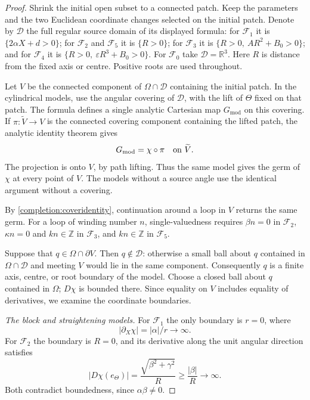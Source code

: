 \documentclass[11pt,a4paper]{article}
\numberwithin{equation}{section}
\theoremstyle{plain}
\theoremstyle{definition}
\theoremstyle{remark}
\begin{document}
\begin{proof}
Shrink the initial open subset to a connected patch. Keep the
parameters and the two Euclidean coordinate changes selected
on the initial patch. Denote by $\mathcal D$ the full regular source
domain of its displayed formula: for $\mathcal F_1$ it is
$\{2\alpha X+d>0\}$; for $\mathcal F_2$ and $\mathcal F_5$ it is
$\{R>0\}$; for $\mathcal F_3$ it is
$\{R>0,\ AR^2+B_0>0\}$; and for $\mathcal F_4$ it is
$\{R>0,\ \varepsilon R^3+B_0>0\}$. For $\mathcal F_0$ take
$\mathcal D=\mathbb R^3$. Here $R$ is distance from the fixed axis or
centre. Positive roots are used throughout.

Let $V$ be the connected component of $\Omega\cap\mathcal D$ containing
the initial patch. In the cylindrical models, use the angular covering
of $\mathcal D$, with the lift of $\Theta$ fixed on that patch. The
formula defines a single analytic Cartesian map $G_{\mathrm{mod}}$ on this covering.
If $\pi:\widetilde V\to V$ is the connected covering component containing
the lifted patch, the analytic identity theorem gives
\begin{equation}\label{completion:coveridentity}
                 G_{\mathrm{mod}}=\chi\circ\pi\quad\hbox{on }\widetilde V.
\end{equation}
The projection is onto $V$, by path lifting. Thus the same model gives
the germ of $\chi$ at every point of $V$. The models without a source
angle use the identical argument without a covering.

By \eqref{completion:coveridentity}, continuation around a loop in $V$
returns the same germ. For a loop of winding number
$n$, single-valuedness requires $\beta n=0$ in $\mathcal F_2$,
$\kappa n=0$ and $kn\in\mathbb Z$ in $\mathcal F_3$, and
$kn\in\mathbb Z$ in $\mathcal F_5$.

Suppose that $q\in\Omega\cap\partial V$. Then
$q\notin\mathcal D$: otherwise a small ball about $q$ contained in
$\Omega\cap\mathcal D$ and meeting $V$ would lie in the same component.
Consequently $q$ is a finite axis, centre, or root boundary of the
model. Choose a closed ball about $q$ contained in $\Omega$; $D\chi$ is
bounded there. Since equality on $V$ includes equality of derivatives,
we examine the coordinate boundaries.

\emph{The block and straightening models.}
For $\mathcal F_1$ the only boundary is $r=0$, where
\[
                  |\partial_X\chi|=|\alpha|/r\longrightarrow\infty.
\]
For $\mathcal F_2$ the boundary is $R=0$, and its derivative along the
unit angular direction satisfies
\[
        |D\chi(e_\Theta)|=\frac{\sqrt{\beta^2+\gamma^2}}{R}
                         \geq\frac{|\beta|}{R}\longrightarrow\infty.
\]
Both contradict boundedness, since $\alpha\beta\ne0$.


\end{proof}
\end{document}
